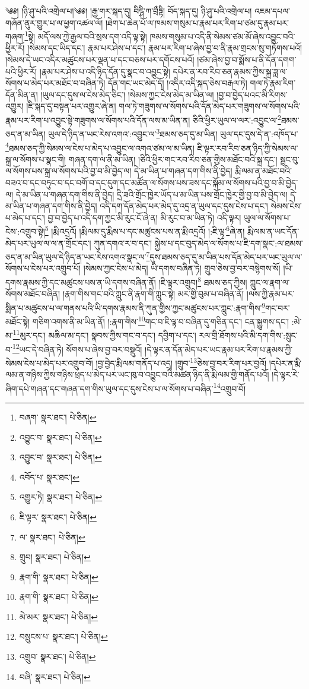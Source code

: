 \setcounter{footnote}{0} 
༄༅། །ཉི་ཤུ་པའི་འགྲེལ་པ།༄༅། །རྒྱ་གར་སྐད་དུ། བིངྴི་ཀ་བྲྀཏྟི། བོད་སྐད་དུ། ཉི་ཤུ་པའི་འགྲེལ་པ། འཇམ་དཔལ་གཞོན་ནུར་གྱུར་པ་ལ་ཕྱག་འཚལ་ལོ། །ཐེག་པ་ཆེན་པོ་ལ་ཁམས་གསུམ་པ་རྣམ་པར་རིག་པ་ཙམ་དུ་རྣམ་པར་གཞག་\footnote{བཞག་  སྣར་ཐང་།  པེ་ཅིན། }སྟེ། མདོ་ལས་ཀྱེ་རྒྱལ་བའི་སྲས་དག་འདི་ལྟ་སྟེ། ཁམས་གསུམ་པ་འདི་ནི་སེམས་ཙམ་མོ་ཞེས་འབྱུང་བའི་ཕྱིར་རོ། །སེམས་དང་ཡིད་དང་། རྣམ་པར་ཤེས་པ་དང་། རྣམ་པར་རིག་པ་ཞེས་བྱ་བ་ནི་རྣམ་གྲངས་སུ་གཏོགས་པའོ། །སེམས་དེ་ཡང་འདིར་མཚུངས་པར་ལྡན་པ་དང་བཅས་པར་དགོངས་པའོ། །ཙམ་ཞེས་བྱ་བ་སྨོས་པ་ནི་དོན་དགག་པའི་ཕྱིར་རོ། །རྣམ་པར་ཤེས་པ་འདི་ཉིད་དོན་དུ་སྣང་བ་འབྱུང་སྟེ། དཔེར་ན་རབ་རིབ་ཅན་རྣམས་ཀྱིས་སྐྲ་ཟླ་ལ་སོགས་པ་མེད་པར་མཐོང་བ་བཞིན་ཏེ། དོན་གང་ཡང་མེད་དོ། །འདིར་འདི་སྐད་ཅེས་བརྒལ་ཏེ། གལ་ཏེ་རྣམ་རིག་དོན་མིན་ན། །ཡུལ་དང་དུས་ལ་ངེས་མེད་ཅིང་། །སེམས་ཀྱང་ངེས་མེད་མ་ཡིན་ལ། །བྱ་བ་བྱེད་པའང་མི་རིགས་འགྱུར། །ཇི་སྐད་དུ་བསྟན་པར་འགྱུར་ཞེ་ན། གལ་ཏེ་གཟུགས་ལ་སོགས་པའི་དོན་མེད་པར་གཟུགས་ལ་སོགས་པའི་རྣམ་པར་རིག་པ་འབྱུང་སྟེ་གཟུགས་ལ་སོགས་པའི་དོན་ལས་མ་ཡིན་ན། ཅིའི་ཕྱིར་ཡུལ་ལ་ལར་:འབྱུང་ལ་\footnote{འབྱུང་བ་  སྣར་ཐང་།  པེ་ཅིན། }ཐམས་ཅད་ན་མ་ཡིན། ཡུལ་དེ་ཉིད་ན་ཡང་རེས་འགའ་:འབྱུང་ལ་\footnote{འབྱུང་བ་  སྣར་ཐང་།  པེ་ཅིན། }ཐམས་ཅད་དུ་མ་ཡིན། ཡུལ་དང་དུས་དེ་ན་:འཁོད་པ་\footnote{འབོད་པ་  སྣར་ཐང་། }ཐམས་ཅད་ཀྱི་སེམས་ལ་ངེས་པ་མེད་པ་འབྱུང་ལ་འགའ་ཙམ་ལ་མ་ཡིན། ཇི་ལྟར་རབ་རིབ་ཅན་ཉིད་ཀྱི་སེམས་ལ་སྐྲ་ལ་སོགས་པ་སྣང་གི། གཞན་དག་ལ་ནི་མ་ཡིན། །ཅིའི་ཕྱིར་གང་རབ་རིབ་ཅན་གྱིས་མཐོང་བའི་སྐྲ་དང་། སྦྲང་བུ་ལ་སོགས་པས་སྐྲ་ལ་སོགས་པའི་བྱ་བ་མི་བྱེད་ལ། དེ་མ་ཡིན་པ་གཞན་དག་གིས་ནི་བྱེད། རྨི་ལམ་ན་མཐོང་བའི་བཟའ་བ་དང་བཏུང་བ་དང་བགོ་བ་དང་དུག་དང་མཚོན་ལ་སོགས་པས་ཟས་དང་སྐོམ་ལ་སོགས་པའི་བྱ་བ་མི་བྱེད་ལ། དེ་མ་ཡིན་པ་གཞན་དག་གིས་ནི་བྱེད། དྲི་ཟའི་གྲོང་ཁྱེར་ཡོད་པ་མ་ཡིན་པས་གྲོང་ཁྱེར་གྱི་བྱ་བ་མི་བྱེད་ལ། དེ་མ་ཡིན་པ་གཞན་དག་གིས་ནི་བྱེད། འདི་དག་དོན་མེད་པར་མེད་དུ་འདྲ་ན་ཡུལ་དང་དུས་ངེས་པ་དང་། སེམས་ངེས་པ་མེད་པ་དང་། བྱ་བ་བྱེད་པ་འདི་དག་ཀྱང་མི་རུང་ངོ་ཞེ་ན། མི་རུང་བ་མ་ཡིན་ཏེ། འདི་ལྟར། ཡུལ་ལ་སོགས་པ་ངེས་:འགྲུབ་སྟེ།\footnote{འགྱུར་ཏེ།  སྣར་ཐང་།  པེ་ཅིན། } །རྨི་འདྲའོ། །རྨི་ལམ་དུ་རྨིས་པ་དང་མཚུངས་པས་ན་རྨི་འདྲའོ། །:ཇི་ལྟ་\footnote{ཇི་ལྟར་  སྣར་ཐང་།  པེ་ཅིན། }ཞེ་ན། རྨི་ལམ་ན་ཡང་དོན་མེད་པར་ཡུལ་ལ་ལ་ན་གྲོང་དང་། ཀུན་དགའ་ར་བ་དང་། སྐྱེས་པ་དང་བུད་མེད་ལ་སོགས་པ་ཇི་དག་སྣང་:ལ་ཐམས་ཅད་ན་མ་ཡིན་ཡུལ་དེ་ཉིད་ན་ཡང་རེས་འགའ་སྣང་ལ་\footnote{ལ་  སྣར་ཐང་།  པེ་ཅིན། }དུས་ཐམས་ཅད་དུ་མ་ཡིན་པས་དོན་མེད་པར་ཡང་ཡུལ་ལ་སོགས་པ་ངེས་པར་འགྲུབ་པོ། །སེམས་ཀྱང་ངེས་པ་མེད། ཡི་དགས་བཞིན་ཏེ། གྲུབ་ཅེས་བྱ་བར་བསྙེགས་སོ། །ཡི་དགས་རྣམས་ཀྱི་དང་མཚུངས་པས་ན་ཡི་དགས་བཞིན་ནོ། །ཇི་ལྟར་འགྲུབ།\footnote{གྲུབ།  སྣར་ཐང་།  པེ་ཅིན། } ཐམས་ཅད་ཀྱིས། ཀླུང་ལ་རྣག་ལ་སོགས་མཐོང་བཞིན། །རྣག་གིས་གང་བའི་ཀླུང་ནི་རྣག་གི་ཀླུང་སྟེ། མར་གྱི་བུམ་པ་བཞིན་ནོ། །ལས་ཀྱི་རྣམ་པར་སྨིན་པ་མཚུངས་པ་ལ་གནས་པའི་ཡི་དགས་རྣམས་ནི་ཀུན་གྱིས་ཀྱང་མཚུངས་པར་ཀླུང་:རྣག་གིས་\footnote{རྣག་གི་  སྣར་ཐང་།  པེ་ཅིན། }གང་བར་མཐོང་སྟེ། གཅིག་འགས་ནི་མ་ཡིན་ནོ། །:རྣག་གིས་\footnote{རྣག་གི་  སྣར་ཐང་།  པེ་ཅིན། }གང་བ་ཇི་ལྟ་བ་བཞིན་དུ་གཅིན་དང་། ངན་སྐྱུགས་དང་། :མེ་མ་\footnote{མེ་མར་  སྣར་ཐང་།  པེ་ཅིན། }མུར་དང་། མཆིལ་མ་དང་། སྣབས་ཀྱིས་གང་བ་དང་། དབྱིག་པ་དང་། རལ་གྲི་ཐོགས་པའི་མི་དག་གིས་:སྲུང་བ་\footnote{བསྲུངས་པ་  སྣར་ཐང་།  པེ་ཅིན། }ཡང་དེ་བཞིན་ཏེ། སོགས་པ་ཞེས་བྱ་བར་བསྡུའོ། །དེ་ལྟར་ན་དོན་མེད་པར་ཡང་རྣམ་པར་རིག་པ་རྣམས་ཀྱི་སེམས་ངེས་པ་མེད་པར་འགྲུབ་བོ། །བྱ་བྱེད་རྨི་ལམ་གནོད་པ་འདྲ། །གྲུབ་\footnote{འགྲུབ་  སྣར་ཐང་།  པེ་ཅིན། }ཅེས་བྱ་བར་རིག་པར་བྱའོ། །དཔེར་ན་རྨི་ལམ་ན་གཉིས་ཀྱིས་གཉིས་ཕྲད་པ་མེད་པར་ཡང་ཁུ་བ་འབྱུང་བའི་མཚན་ཉིད་ནི་རྨི་ལམ་གྱི་གནོད་པའོ། །དེ་ལྟར་རེ་ཞིག་དཔེ་གཞན་དང་གཞན་དག་གིས་ཡུལ་དང་དུས་ངེས་པ་ལ་སོགས་པ་བཞིན་\footnote{བཞི་  སྣར་ཐང་།  པེ་ཅིན། }འགྲུབ་བོ། 